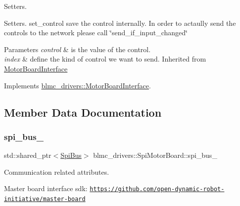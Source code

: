 Setters. 

Setters. set\+\_\+control save the control internally. In order to actaully send the controls to the network please call \char`\"{}send\+\_\+if\+\_\+input\+\_\+changed\char`\"{}


\begin{DoxyParams}{Parameters}
{\em control} & is the value of the control. \\
\hline
{\em index} & define the kind of control we want to send. Inherited from \hyperlink{classblmc__drivers_1_1MotorBoardInterface}{Motor\+Board\+Interface} \\
\hline
\end{DoxyParams}


Implements \hyperlink{classblmc__drivers_1_1MotorBoardInterface_a3ace57ba3e09b9b3120d09303ff39a61}{blmc\+\_\+drivers\+::\+Motor\+Board\+Interface}.



\subsection{Member Data Documentation}
\mbox{\label{classblmc__drivers_1_1SpiMotorBoard_a767abb6f687ed8bf7fef873ab892eaf7}} 
\subsubsection{\texorpdfstring{spi\+\_\+bus\+\_\+}{spi\_bus\_}}
{\footnotesize\ttfamily std\+::shared\+\_\+ptr$<$\hyperlink{classblmc__drivers_1_1SpiBus}{Spi\+Bus}$>$ blmc\+\_\+drivers\+::\+Spi\+Motor\+Board\+::spi\+\_\+bus\+\_\+\hspace{0.3cm}{\ttfamily [private]}}



Communication related attributes. 

Master board interface sdk\+: \href{https://github.com/open-dynamic-robot-initiative/master-board}{\tt https\+://github.\+com/open-\/dynamic-\/robot-\/initiative/master-\/board} \mbox{\label{classblmc__drivers_1_1SpiMotorBoard_a4b865479722dbecec8ebb66d6b93ecae}} 
